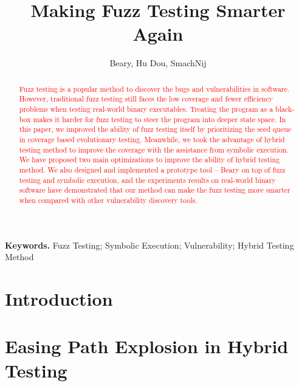 \documentclass[a4paper]{article}
\begin{document}
\title{Making Fuzz Testing Smarter Again}
\author{Beary, Hu Dou, SmachNij}
\maketitle

\begin{abstract}

\textcolor{red}{Fuzz testing is a popular method to discover the bugs and vulnerabilities in software. However, traditional fuzz testing still faces the low coverage and fewer efficiency problems when testing real-world binary executables. Treating the program as a black-box makes it harder for fuzz testing to steer the program into deeper state space. In this paper, we improved the ability of fuzz testing itself by prioritizing the seed queue in coverage based evolutionary testing. Meanwhile, we took the advantage of hybrid testing method to improve the coverage with the assistance from symbolic execution. We have proposed two main optimizations to improve the ability of hybrid testing method. We also designed and implemented a prototype tool -- Beary on top of fuzz testing and symbolic execution, and the experiments results on real-world binary software have demonstrated that our method can make the fuzz testing more smarter when compared with other vulnerability discovery tools.}
\end{abstract}
\textbf{Keywords.} Fuzz Testing; Symbolic Execution; Vulnerability; Hybrid Testing Method

\section{Introduction} \label{sec:introduction}


\section{Easing Path Explosion in Hybrid Testing} \label{sec:ease PE}

\end{document}
